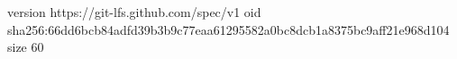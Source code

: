 version https://git-lfs.github.com/spec/v1
oid sha256:66dd6bcb84adfd39b3b9c77eaa61295582a0bc8dcb1a8375bc9aff21e968d104
size 60
